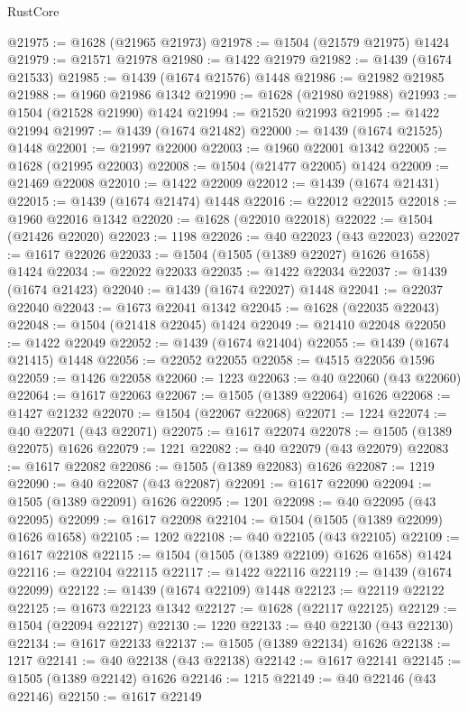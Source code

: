 \begin{lexlean}{RustCore}
\begin{coremodule}
@21975 := @1628 (@21965 @21973)
@21978 := @1504 (@21579 @21975) @1424
@21979 := @21571 @21978
@21980 := @1422 @21979
@21982 := @1439 (@1674 @21533)
@21985 := @1439 (@1674 @21576) @1448
@21986 := @21982 @21985
@21988 := @1960 @21986 @1342
@21990 := @1628 (@21980 @21988)
@21993 := @1504 (@21528 @21990) @1424
@21994 := @21520 @21993
@21995 := @1422 @21994
@21997 := @1439 (@1674 @21482)
@22000 := @1439 (@1674 @21525) @1448
@22001 := @21997 @22000
@22003 := @1960 @22001 @1342
@22005 := @1628 (@21995 @22003)
@22008 := @1504 (@21477 @22005) @1424
@22009 := @21469 @22008
@22010 := @1422 @22009
@22012 := @1439 (@1674 @21431)
@22015 := @1439 (@1674 @21474) @1448
@22016 := @22012 @22015
@22018 := @1960 @22016 @1342
@22020 := @1628 (@22010 @22018)
@22022 := @1504 (@21426 @22020)
@22023 := 1198
@22026 := @40 @22023 (@43 @22023)
@22027 := @1617 @22026
@22033 := @1504 (@1505 (@1389 @22027) @1626 @1658) @1424
@22034 := @22022 @22033
@22035 := @1422 @22034
@22037 := @1439 (@1674 @21423)
@22040 := @1439 (@1674 @22027) @1448
@22041 := @22037 @22040
@22043 := @1673 @22041 @1342
@22045 := @1628 (@22035 @22043)
@22048 := @1504 (@21418 @22045) @1424
@22049 := @21410 @22048
@22050 := @1422 @22049
@22052 := @1439 (@1674 @21404)
@22055 := @1439 (@1674 @21415) @1448
@22056 := @22052 @22055
@22058 := @4515 @22056 @1596
@22059 := @1426 @22058
@22060 := 1223
@22063 := @40 @22060 (@43 @22060)
@22064 := @1617 @22063
@22067 := @1505 (@1389 @22064) @1626
@22068 := @1427 @21232
@22070 := @1504 (@22067 @22068)
@22071 := 1224
@22074 := @40 @22071 (@43 @22071)
@22075 := @1617 @22074
@22078 := @1505 (@1389 @22075) @1626
@22079 := 1221
@22082 := @40 @22079 (@43 @22079)
@22083 := @1617 @22082
@22086 := @1505 (@1389 @22083) @1626
@22087 := 1219
@22090 := @40 @22087 (@43 @22087)
@22091 := @1617 @22090
@22094 := @1505 (@1389 @22091) @1626
@22095 := 1201
@22098 := @40 @22095 (@43 @22095)
@22099 := @1617 @22098
@22104 := @1504 (@1505 (@1389 @22099) @1626 @1658)
@22105 := 1202
@22108 := @40 @22105 (@43 @22105)
@22109 := @1617 @22108
@22115 := @1504 (@1505 (@1389 @22109) @1626 @1658) @1424
@22116 := @22104 @22115
@22117 := @1422 @22116
@22119 := @1439 (@1674 @22099)
@22122 := @1439 (@1674 @22109) @1448
@22123 := @22119 @22122
@22125 := @1673 @22123 @1342
@22127 := @1628 (@22117 @22125)
@22129 := @1504 (@22094 @22127)
@22130 := 1220
@22133 := @40 @22130 (@43 @22130)
@22134 := @1617 @22133
@22137 := @1505 (@1389 @22134) @1626
@22138 := 1217
@22141 := @40 @22138 (@43 @22138)
@22142 := @1617 @22141
@22145 := @1505 (@1389 @22142) @1626
@22146 := 1215
@22149 := @40 @22146 (@43 @22146)
@22150 := @1617 @22149

\end{coremodule}
\end{lexlean}
